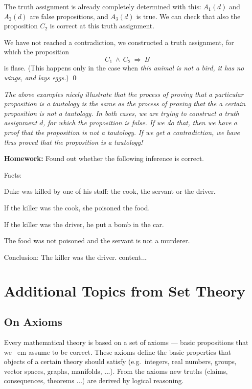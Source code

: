 \documentclass[11pt,paper=b5,footinclude,headinclude]{scrbook} %
\def\inn {{~\wedge~}}
\def\sledi {{~\Rightarrow~}}
\theoremstyle{remark}
\theoremstyle{definition} %
\theoremstyle{theorem} %
\begin{document}
The truth assignment is already completely determined with this: $A_1(d)$ and $A_2(d)$ are false propositions, and
$A_3(d)$ is true. We can check that also the proposition $C_2$ is correct at this truth assignment.

We have not reached a contradiction, we constructed a truth assignment, for which the proposition $$C_1\inn C_2\sledi B$$
is flase. (This happens only in the case when {\em this animal is not a bird, it has no wings, and lays eggs.})
\qed

\medskip
\begin{sloppypar}
{\em The above examples nicely illustrate that the process of proving that a particular proposition is a tautology is  the same as the process of proving  that the a certain proposition is not a tautology. In both cases, we are trying to construct a truth assignment $d$, for which the proposition is false.
If we do that, then we have a proof that the proposition is not a tautology. If we get a contradiction, we have thus proved that the proposition is a tautology!}
\end{sloppypar}

\bigskip
\textbf{ Homework:}
Found out whether the following inference is correct.

Facts:

Duke was killed by one of his staff: the cook, the servant or the driver.

If the killer was the cook, she poisoned the food.

If the killer was the driver, he put a bomb in the car.

The food was not poisoned and the servant is not a murderer.

Conclusion: The killer was the driver.
	content...

\chapter{Additional Topics from Set Theory}

\section{On Axioms}

Every mathematical theory is based on a set of axioms --- basic propositions that we {\ em assume} to be correct.
These axioms define the basic properties that objects of a certain theory should satisfy (e.g.~integers, real numbers, groups, vector spaces, graphs, manifolds, ...). From the axioms new truths (claims, consequences, theorems ...) are derived by logical reasoning.
\end{document}

